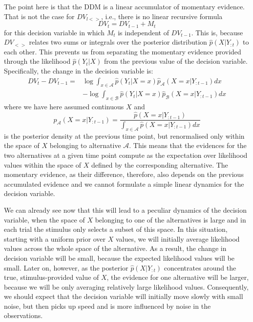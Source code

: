 \documentclass[10pt,a4paper]{article}
\begin{document}
The point here is that the DDM is a linear accumulator of momentary evidence. That is not the case for $DV_{l<>}$, i.e., there is no linear recursive formula
\begin{equation*}
DV_t = DV_{t-1} + M_t
\end{equation*}
for this decision variable in which $M_t$ is independent of $DV_{t-1}$. This is, because $DV_{<>}$ relates two sums or integrals over the posterior distribution $\hat{p}(X | Y_{:t})$ to each other. This prevents us from separating the momentary evidence provided through the likelihood $\hat{p}(Y_t | X)$ from the previous value of the decision variable. Specifically, the change in the decision variable is:
\begin{equation}
\begin{aligned}
DV_t - DV_{t-1} = &\log \int_{x \in \mathcal{A}} \hat{p}(Y_t | X=x) \hat{p}_\mathcal{A}(X=x | Y_{:t-1})dx\\ &- \log \int_{x \in \mathcal{B}} \hat{p}(Y_t | X=x) \hat{p}_\mathcal{B}(X=x | Y_{:t-1})dx
\end{aligned}
\end{equation}
where we have here assumed continuous $X$ and
\begin{equation}
\hat{p}_\mathcal{A}(X=x | Y_{:t-1}) = \frac{\hat{p}(X=x | Y_{:t-1})}{\int_{x \in \mathcal{A}} \hat{p}(X=x | Y_{:t-1}) dx}
\end{equation}
is the posterior density at the previous time point, but renormalised only within the space of $X$ belonging to alternative $\mathcal{A}$. This means that the evidences for the two alternatives at a given time point compute as the expectation over likelihood values within the space of $X$ defined by the corresponding alternative. The momentary evidence, as their difference, therefore, also depends on the previous accumulated evidence and we cannot formulate a simple linear dynamics for the decision variable.

We can already see now that this will lead to a peculiar dynamics of the decision variable, when the space of $X$ belonging to one of the alternatives is large and in each trial the stimulus only selects a subset of this space. In this situation, starting with a uniform prior over $X$ values, we will initially average likelihood values across the whole space of the alternative. As a result, the change in decision variable will be small, because the expected likelihood values will be small. Later on, however, as the posterior $\hat{p}(X | Y_{:t})$ concentrates around the true, stimulus-provided value of $X$, the evidence for one alternative will be larger, because we will be only averaging relatively large likelihood values. Consequently, we should expect that the decision variable will initially move slowly with small noise, but then picks up speed and is more influenced by noise in the observations.
\end{document}
